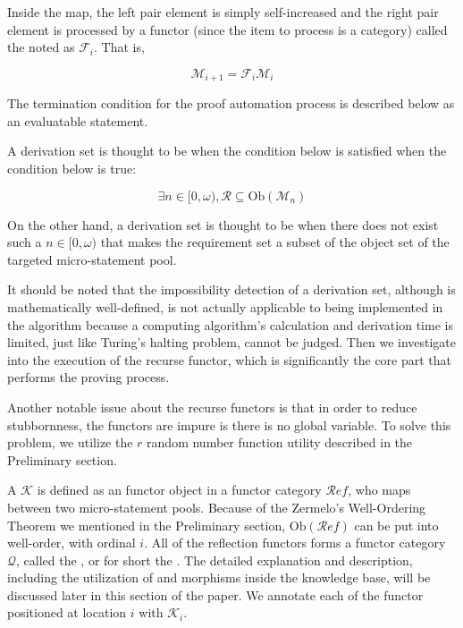 \documentclass{article}
\begin{document}
Inside the map, the left pair element is simply self-increased and the right pair element is processed by a functor (since the item to process is a category) called the  noted as \(\mathcal{F}_i\). That is,

\[\mathcal{M}_{i+1}=\mathcal{F}_i\mathcal{M}_i\]

The termination condition for the proof automation process is described below as an evaluatable statement. 

 A derivation set is thought to be  when the condition below is satisfied when the condition below is true:

\[\exists n\in [0,\omega ), \mathcal{R}\subseteq \text{Ob}\left(\mathcal{M}_n\right)\]

On the other hand, a derivation set is thought to be  when there does not exist such a \(n\in [0,\omega )\) that makes the requirement set a subset of the object set of the targeted micro-statement pool.

It should be noted that the impossibility detection of a derivation set, although is mathematically well-defined, is not actually applicable to being implemented in the algorithm because a computing algorithm{'}s calculation and derivation time is limited, just like Turing{'}s halting problem, cannot be judged. Then we investigate into the execution of the recurse functor, which is significantly the core part that performs the proving process.

Another notable issue about the recurse functors is that in order to reduce stubbornness, the functors are impure is there is no global variable. To solve this problem, we utilize the \(\mathit{r}\) random number function utility described in the Preliminary section.

A  \(\mathcal{K}\) is defined as an functor object in a functor category \(\mathcal{R}\mathit{e}\mathit{f}\), who maps between two micro-statement pools. Because of the Zermelo{'}s Well-Ordering Theorem we mentioned in the Preliminary section, \(\text{Ob}(\mathcal{R}\mathit{e}\mathit{f})\) can be put into well-order, with ordinal \(i\). All of the reflection functors forms a functor category \(\mathcal{Q}\), called the , or for short the . The detailed explanation and description, including the utilization of and morphisms inside the knowledge base, will be discussed later in this section of the paper. We annotate each of the functor positioned at location \(i\) with \(\mathcal{K}_i\).
\end{document}
